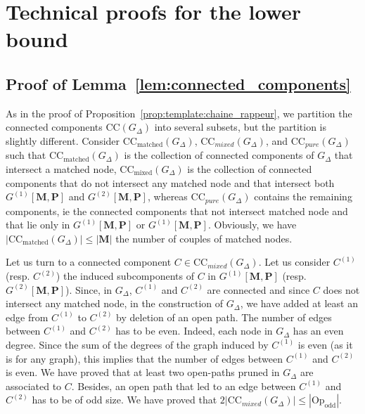 \documentclass{article}
\begin{document}
\section{Technical proofs for the lower bound}\label{sec:proof:technical:LB}

\subsection{Proof of Lemma~\ref{lem:connected_components}}

As in the proof of Proposition~\ref{prop:template:chaine_rappeur}, we partition the connected components $\mathrm{CC}(G_{\Delta})$ into several subsets, but the partition is slightly different. Consider $\mathrm{CC}_{\mathrm{matched}}(G_{\Delta})$, $\mathrm{CC}_{mixed}(G_{\Delta})$, and  $\mathrm{CC}_{pure}(G_{\Delta})$ such that $\mathrm{CC}_{\mathrm{matched}}(G_{\Delta})$ is the collection of connected components of $G_{\Delta}$ that intersect a matched node, $\mathrm{CC}_{\mathrm{mixed}}(G_{\Delta})$ is the collection of connected components that do not intersect any matched node and that intersect both $G^{(1)}[\mathbf{M},\mathbf{P}]$ and $G^{(2)}[\mathbf{M},\mathbf{P}]$, whereas $\mathrm{CC}_{pure}(G_{\Delta})$ contains the remaining components, ie the connected components that not intersect matched node and that lie only in $G^{(1)}[\mathbf{M},\mathbf{P}]$ or $G^{(1)}[\mathbf{M},\mathbf{P}]$. Obviously, we have $|\mathrm{CC}_{\mathrm{matched}}(G_{\Delta})|\leq |\mathbf{M}|$ the number of couples of matched nodes. 

Let us turn to a connected component $C\in \mathrm{CC}_{mixed}(G_{\Delta})$. Let us consider $C^{(1)}$ (resp. $C^{(2)}$) the induced subcomponents of $C$ in $G^{(1)}[\mathbf{M},\mathbf{P}]$ (resp. $G^{(2)}[\mathbf{M},\mathbf{P}]$). Since, in $G_{\Delta}$, $C^{(1)}$ and $C^{(2)}$ are connected and since $C$ does not intersect any matched node, in the construction of $G_{\Delta}$, we have added at least an edge from $C^{(1)}$ to $C^{(2)}$ by deletion of an open path. The number of edges between $C^{(1)}$ and $C^{(2)}$ has to be even. Indeed, each node in $G_{\Delta}$ has an even degree. Since the sum of the degrees of the graph induced by $C^{(1)}$ is even (as it is for any graph), this implies that the number of edges between $C^{(1)}$ and $C^{(2)}$ is even. We have proved that at least two open-paths pruned in $G_{\Delta}$ are associated to $C$. Besides, an open path that led to an edge between $C^{(1)}$ and $C^{(2)}$ has to be of odd size. We have proved that $2|\mathrm{CC}_{mixed}(G_{\Delta})|\leq |\mathrm{Op}_{\mathrm{odd}}|$. 
\end{document}
